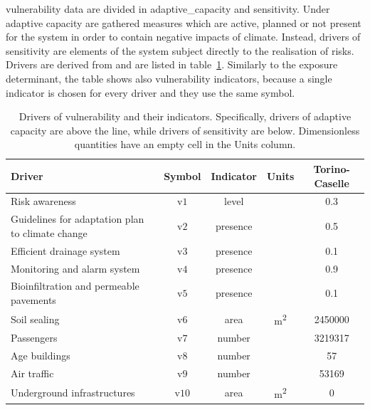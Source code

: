 \Gls{vulnerability} data are divided in \gls{adaptive_capacity} and \gls{sensitivity}. Under adaptive capacity are gathered measures which are active, planned or not present for the system in order to contain negative \glspl{impact} of climate. Instead, \glspl{driver} of sensitivity are elements of the system subject directly to the realisation of risks. Drivers are derived from \cite[555-556,558]{2022DeVivoRiskAssessment} and are listed in table~\ref{tab:drivers_vulnerability}. Similarly to the \gls{exposure} \gls{determinant}, the table shows also vulnerability \glspl{indicator}, because a single indicator is chosen for every driver and they use the same symbol.
\begin{table}[h]
  \renewcommand*{\arraystretch}{1.5}
  \centering
  \caption{Drivers of vulnerability and their indicators. Specifically, drivers of adaptive capacity are above the line, while drivers of sensitivity are below. Dimensionless quantities have an empty cell in the Units column.}
  \label{tab:drivers_vulnerability}
  \begin{tabular}{p{}cccc}
    Driver                                           & Symbol         & Indicator & Units                & Torino-Caselle \\
    \hline
    Risk awareness                                   & $\mathrm{v1}$  & level     &                      & 0.3            \\
    Guidelines for adaptation plan to climate change & $\mathrm{v2}$  & presence  &                      & 0.5            \\
    Efficient drainage system                        & $\mathrm{v3}$  & presence  &                      & 0.1            \\
    Monitoring and alarm system                      & $\mathrm{v4}$  & presence  &                      & 0.9            \\
    Bioinfiltration and permeable pavements          & $\mathrm{v5}$  & presence  &                      & 0.1            \\
    \hline
    Soil sealing                                     & $\mathrm{v6}$  & area      & \unit{\square\metre} & 2450000        \\
    Passengers                                       & $\mathrm{v7}$  & number    &                      & 3219317        \\
    Age buildings                                    & $\mathrm{v8}$  & number    &                      & 57             \\
    Air traffic                                      & $\mathrm{v9}$  & number    &                      & 53169          \\
    Underground infrastructures                      & $\mathrm{v10}$ & area      & \unit{\square\metre} & 0              \\
    \end{tabular}
\end{table}

